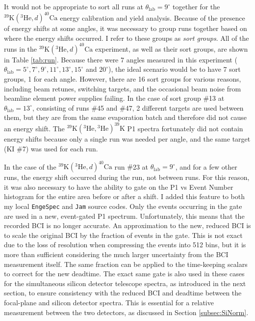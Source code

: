 It would not be appropriate to sort all runs at $\theta_{\mathrm{lab}} = 9^{\circ}$ together for the $^{39}\mathrm{K}(^{3}\mathrm{He},d)^{40}\mathrm{Ca}$ energy calibration and yield analysis. Because of the presence of energy shifts at some angles, it was necessary to group runs together based on where the energy shifts occurred. I refer to these groups as \emph{sort groups}. All of the runs in the $^{39}\mathrm{K}(^{3}\mathrm{He},d)^{40}\mathrm{Ca}$ experiment, as well as their sort groups, are shown in Table \ref{tab:run}. Because there were 7 angles measured in this experiment ($\theta_{\mathrm{lab}} = 5^{\circ}, 7^{\circ}, 9^{\circ}, 11^{\circ}, 13^{\circ}, 15^{\circ}$ and $20^{\circ}$), the ideal scenario would be to have 7 sort groups, 1 for each angle. However, there are 16 sort groups for various reasons, including beam retunes, switching targets, and the occasional beam noise from beamline element power supplies failing. In the case of sort group $\#$13 at $\theta_{\mathrm{lab}} = 13^{\circ}$, consisting of runs $\#$45 and $\#$47, 2 different targets are used between them, but they are from the same evaporation batch and therefore did not cause an energy shift. The $^{39}\mathrm{K}(^{3}\mathrm{He}, {}^{3}\mathrm{He})^{39}\mathrm{K}$ P1 spectra fortunately did not contain energy shifts because only a single run was needed per angle, and the same target (KI $\#$7) was used for each run.

In the case of the $^{39}\mathrm{K}(^{3}\mathrm{He},d)^{40}\mathrm{Ca}$ run $\#$23 at $\theta_{\mathrm{lab}} = 9^{\circ}$, and for a few other runs, the energy shift occurred during the run, not between runs. For this reason, it was also necessary to have the ability to gate on the P1 vs Event Number histogram for the entire area before or after a shift. I added this feature to both my local \texttt{EngeSpec} and \texttt{Jam} source codes. Only the events occurring in the gate are used in a new, event-gated P1 spectrum. Unfortunately, this means that the recorded BCI is no longer accurate. An approximation to the new, reduced BCI is to scale the original BCI by the fraction of events in the gate. This is not exact due to the loss of resolution when compressing the events into 512 bins, but it is more than sufficient considering the much larger uncertainty from the BCI measurement itself. The same fraction can be applied to the time-keeping scalars to correct for the new deadtime. The exact same gate is also used in these cases for the simultaneous silicon detector telescope spectra, as introduced in the next section, to ensure consistency with the reduced BCI and deadtime between the focal-plane and silicon detector spectra. This is essential for a relative measurement between the two detectors, as discussed in Section \ref{subsec:SiNorm}.

